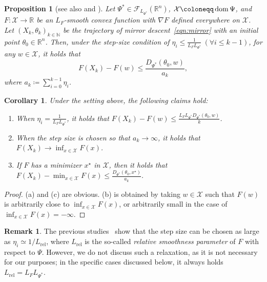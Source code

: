 \documentclass[11pt,a4paper]{article}
\theoremstyle{definition}
\newtheorem{rem}{Remark}[section]
\theoremstyle{plain}
\newtheorem{prop}[prop]{Proposition}
\newtheorem{cor}[cor]{Corollary}
\newcommand{\RR}{{\mathbb{R}}}
\newcommand{\NN}{{\mathbb{N}}}
\newcommand{\dom}{\mathop{\rm dom}}
\begin{document}
\begin{prop}[{see also \cite[Theorem~1]{BBT2017} and \cite[Theorem~3.1]{LFN2018}}]
    \label{prop:mirror}
    Let $\Psi^\ast \in \mathcal{F}_{L_{\Psi^\ast}}(\RR^n)$, $\mathcal{X} \coloneqq \dom \Psi$, and $F:\mathcal{X} \to \RR$ be an $L_F$-smooth convex function with $\nabla F$ defined everywhere on $\mathcal{X}$.
    Let $(X_k, \theta_k)_{k \in \NN}$ be the trajectory of mirror descent~\eqref{eqn:mirror} with an initial point $\theta_0 \in \RR^n$.
    Then, under the step-size condition of $\eta_i \le \frac1{L_FL_{\Psi^\ast}}\ (\forall i \le k - 1)$, for any $w \in \mathcal{X}$, it holds that
    \[
        F(X_k) - F(w) \le \frac{D_{\Psi^\ast}(\theta_0, w)}{a_k},
    \]
    where $a_k \coloneqq \sum_{i = 0}^{k - 1}\eta_i$.
\end{prop}
\begin{cor}
    \label{cor:mirror}
    Under the setting above, the following claims hold:
    \begin{enumerate}
        \item[(a)] When $\eta_i = \frac1{L_FL_{\Psi^\ast}}$, it holds that $F(X_k) - F(w) \le \frac{L_FL_{\Psi^\ast}D_{\Psi^\ast}(\theta_0, w)}k$.
        \item[(b)] When the step size is chosen so that $a_k \to \infty$, it holds that $F(X_k) \to \inf_{x \in \mathcal{X}}F(x)$.
        \item[(c)] If $F$ has a minimizer $x^\star$ in $\mathcal{X}$, then it holds that $F(X_k) - \min_{x \in \mathcal{X}}F(x) \le \frac{D_{\Psi^\ast}(\theta_0, x^\star)}{a_k}$.
    \end{enumerate}
\end{cor}
\begin{proof}
    (a) and (c) are obvious.
    (b) is obtained by taking $w \in \mathcal{X}$ such that $F(w)$ is arbitrarily close to $\inf_{x \in \mathcal{X}}F(x)$, or arbitrarily small in the case of $\inf_{x \in \mathcal{X}}F(x) = -\infty$.
\end{proof}
\begin{rem}
    The previous studies~\cite{BBT2017, LFN2018} show that the step size can be chosen as large as $\eta_i \simeq 1/L_\mathrm{rel}$, where $L_\mathrm{rel}$ is the so-called \textit{relative smoothness parameter} of $F$ with respect to $\Psi$.
    However, we do not discuss such a relaxation, as it is not necessary for our purposes; in the specific cases discussed below, it always holds $L_\mathrm{rel} = L_FL_{\Psi^\ast}$.
\end{rem}
\end{document}
